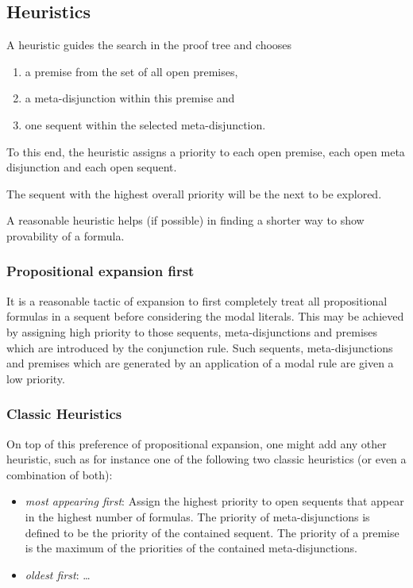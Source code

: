 \documentclass{llncs}
\begin{document}
\subsection{Heuristics}

A heuristic guides the search in the proof tree and chooses 

\begin{enumerate}
\item a premise from the set of all open premises,
\item a meta-disjunction within this premise and
\item one sequent within the selected meta-disjunction.
\end{enumerate}

To this end, the heuristic assigns a priority to each open premise,
each open meta disjunction and each open sequent.

The sequent with the highest overall priority will be the next to be explored.

A reasonable heuristic helps (if possible) in finding a shorter way to show
provability of a formula.

\subsubsection{Propositional expansion first}

It is a reasonable tactic of expansion to first completely treat all
propositional formulas in a sequent before considering the modal
literals. This may be achieved by assigning high priority to
those sequents, meta-disjunctions and premises which are introduced
by the conjunction rule. Such sequents, meta-disjunctions and premises
which are generated by an application of a modal rule are given a low priority.

\subsubsection{Classic Heuristics}

On top of this preference of propositional expansion, one might add any
other heuristic, such as for instance one of the following two classic
heuristics (or even a combination of both):

\begin{itemize}
\item \emph{most appearing first}: Assign the highest priority to open sequents
that appear in the highest number of formulas. The priority of meta-disjunctions
is defined to be the priority of the contained sequent. The priority of a premise
is the maximum of the priorities of the contained meta-disjunctions.
\item \emph{oldest first}: \ldots
\end{itemize}
\end{document}
